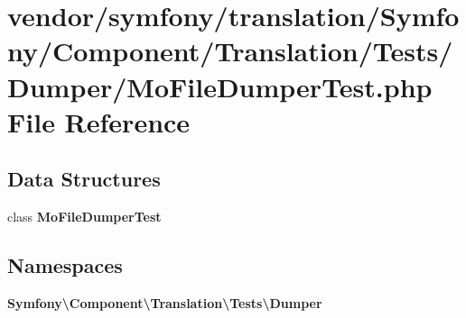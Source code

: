 \section{vendor/symfony/translation/\+Symfony/\+Component/\+Translation/\+Tests/\+Dumper/\+Mo\+File\+Dumper\+Test.php File Reference}
\label{_mo_file_dumper_test_8php}
\subsection*{Data Structures}
\begin{DoxyCompactItemize}
\item 
class {\bf Mo\+File\+Dumper\+Test}
\end{DoxyCompactItemize}
\subsection*{Namespaces}
\begin{DoxyCompactItemize}
\item 
 {\bf Symfony\textbackslash{}\+Component\textbackslash{}\+Translation\textbackslash{}\+Tests\textbackslash{}\+Dumper}
\end{DoxyCompactItemize}

